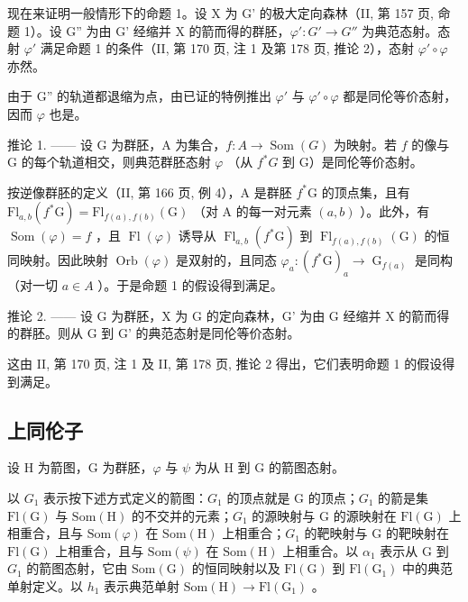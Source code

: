 现在来证明一般情形下的命题 1。设 X 为 G' 的极大定向森林（II, 第 157 页, 命题 1）。设 G'' 为由 G' 经缩并 X 的箭而得的群胚，\(\varphi'\colon G' \to G''\) 为典范态射。态射 \(\varphi'\) 满足命题 1 的条件（II, 第 170 页, 注 1 及第 178 页, 推论 2），态射 \(\varphi'\circ\varphi\) 亦然。

由于 G'' 的轨道都退缩为点，由已证的特例推出 \(\varphi'\) 与 \(\varphi'\circ\varphi\) 都是同伦等价态射，因而 \(\varphi\) 也是。

推论 1. —— 设 G 为群胚，A 为集合，\(f\colon A \to \operatorname{Som}(G)\) 为映射。若 \(f\) 的像与 G 的每个轨道相交，则典范群胚态射 \(\varphi\) （从 \(f^{*}G\) 到 G）是同伦等价态射。

按逆像群胚的定义（II, 第 166 页, 例 4），A 是群胚 \(f^{*}\mathrm{G}\) 的顶点集，且有 \(\mathrm{Fl}_{a,b}(f^{*}\mathrm{G}) = \mathrm{Fl}_{f(a),f(b)}(\mathrm{G})\) （对 A 的每一对元素 \((a,b)\) ）。此外，有 \(\operatorname{Som}(\varphi) = f\) ，且 \(\operatorname{Fl}(\varphi)\) 诱导从 \(\operatorname{Fl}_{a,b}(f^{*}\mathrm{G})\) 到 \(\operatorname{Fl}_{f(a),f(b)}(\mathrm{G})\) 的恒同映射。因此映射 \(\operatorname{Orb}(\varphi)\) 是双射的，且同态 \(\varphi_{a}\colon (f^{*}\mathrm{G})_{a} \to \operatorname{G}_{f(a)}\) 是同构（对一切 \(a \in A\) ）。于是命题 1 的假设得到满足。

推论 2. —— 设 G 为群胚，X 为 G 的定向森林，G' 为由 G 经缩并 X 的箭而得的群胚。则从 G 到 G' 的典范态射是同伦等价态射。

这由 II, 第 170 页, 注 1 及 II, 第 178 页, 推论 2 得出，它们表明命题 1 的假设得到满足。

\subsection{上同伦子}

设 H 为箭图，G 为群胚，\(\varphi\) 与 \(\psi\) 为从 H 到 G 的箭图态射。

以 \(G_{1}\) 表示按下述方式定义的箭图：\(G_{1}\) 的顶点就是 G 的顶点；\(G_{1}\) 的箭是集 \(\mathrm{Fl(G)}\) 与 \(\mathrm{Som(H)}\) 的不交并的元素；\(G_{1}\) 的源映射与 G 的源映射在 \(\mathrm{Fl(G)}\) 上相重合，且与 \(\mathrm{Som}(\varphi)\) 在 \(\mathrm{Som(H)}\) 上相重合；\(G_{1}\) 的靶映射与 G 的靶映射在 \(\mathrm{Fl(G)}\) 上相重合，且与 \(\mathrm{Som}(\psi)\) 在 \(\mathrm{Som(H)}\) 上相重合。以 \(\alpha_{1}\) 表示从 G 到 \(G_{1}\) 的箭图态射，它由 \(\mathrm{Som(G)}\) 的恒同映射以及 \(\mathrm{Fl(G)}\) 到 \(\mathrm{Fl(G_{1})}\) 中的典范单射定义。以 \(h_{1}\) 表示典范单射 \(\mathrm{Som(H)} \to \mathrm{Fl(G_{1})}\) 。

